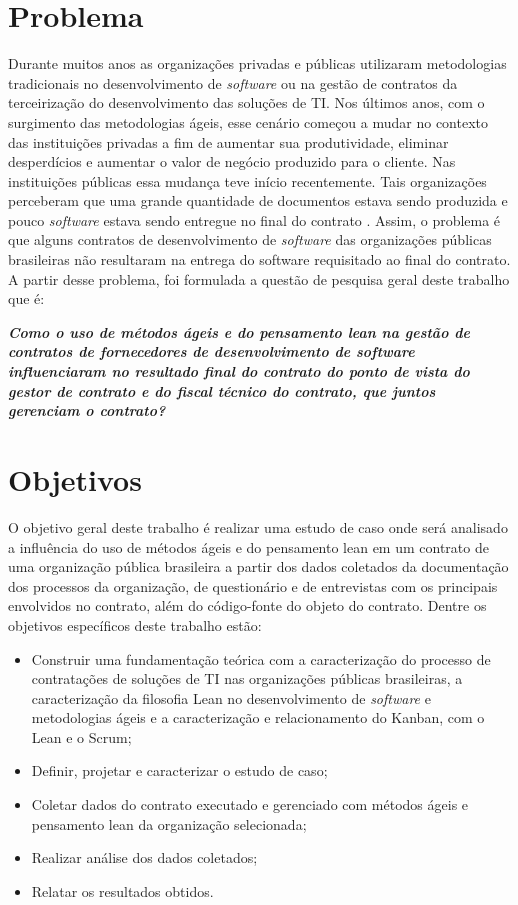 \section[Problema]{Problema}

Durante muitos anos as organizações privadas e públicas utilizaram metodologias tradicionais no desenvolvimento de \textit{software} ou na gestão de contratos da terceirização do desenvolvimento das soluções de TI. Nos últimos anos, com o surgimento das metodologias ágeis, esse cenário começou a mudar no contexto das instituições privadas a fim de aumentar sua produtividade, eliminar desperdícios e aumentar o valor de negócio produzido para o cliente. Nas instituições públicas essa mudança teve início recentemente. Tais organizações perceberam que uma grande quantidade de documentos estava sendo produzida e pouco \textit{software} estava sendo entregue no final do contrato \cite{TCU:2013}. Assim, o problema é que alguns contratos de desenvolvimento de \textit{software} das organizações públicas brasileiras não resultaram na entrega do software requisitado ao final do contrato. A partir desse problema, foi formulada a questão de pesquisa geral deste trabalho que é:

\textit{\textbf {Como o uso de métodos ágeis e do pensamento lean na gestão de contratos de fornecedores de desenvolvimento de software influenciaram no resultado final do contrato do ponto de vista do gestor de contrato e do fiscal técnico do contrato, que juntos gerenciam o contrato?
}}

\section[Objetivos]{Objetivos}

O objetivo geral deste trabalho é realizar uma estudo de caso onde será analisado a influência do uso de métodos ágeis e do pensamento lean em um contrato de uma organização pública brasileira a partir dos dados coletados da documentação dos processos da organização, de questionário e de entrevistas com os principais envolvidos no contrato, além do código-fonte do objeto do contrato. Dentre os objetivos específicos deste trabalho estão:

\begin{itemize}
\item Construir uma fundamentação teórica com a caracterização do processo de contratações de soluções de TI nas organizações públicas brasileiras, a caracterização da filosofia Lean no desenvolvimento de \textit{software} e metodologias ágeis e a caracterização e relacionamento do Kanban, com o Lean e o Scrum;
\item Definir, projetar e caracterizar o estudo de caso;
\item Coletar dados do contrato executado e gerenciado com métodos ágeis e pensamento lean da organização selecionada;
\item Realizar análise dos dados coletados;
\item Relatar os resultados obtidos.
\end{itemize}

